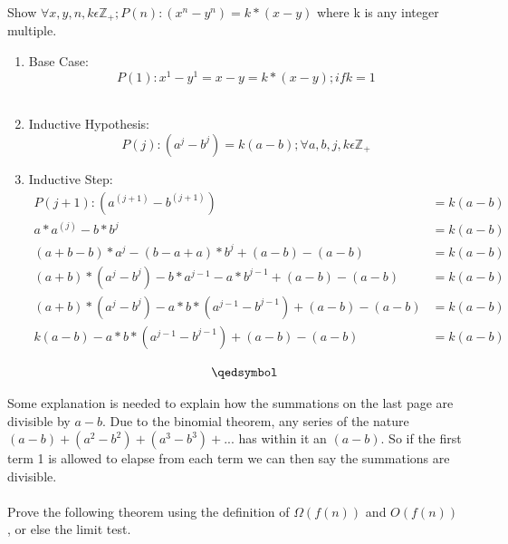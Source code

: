 \documentclass[12pt]{article}
\begin{document}
\noindent Show \begin{math}\forall x,y,n,k \epsilon \mathbb{Z}_+ ; P(n):(x^n-y^n) = k * (x-y)\end{math} where k is any integer multiple.
\begin{enumerate}
\item Base Case:\\
\[P(1): x^1 - y^1   = x - y = k * (x - y); if k = 1\]\\
\item Inductive Hypothesis:
\[P(j):(a^j - b^j) = k(a - b); \forall a,b,j,k \epsilon \mathbb{Z}_+\]
\item Inductive Step:\\
\begin{align*}
P(j+1):(a^(j+1) - b^(j+1)) &= k(a-b)\\
a*a^(j) - b*b^j &= k(a-b)\\
(a+b-b)*a^j - (b - a + a)*b^j + (a - b) - (a - b) &= k(a-b)\\
(a+b)*(a^j-b^j) - b*a^{j-1}-a*b^{j-1}+ (a - b) - (a - b) &= k(a-b)\\
(a+b)*(a^j-b^j) - a*b*(a^{j-1}-b^{j-1})+ (a - b) - (a - b) &= k(a-b)\\
k(a - b) - a*b*(a^{j-1}-b^{j-1})+ (a - b) - (a - b) &= k(a-b)\\
\end{align*}
\begin{align*}
&\hspace{0.3cm}\qedsymbol
\end{align*}
\end{enumerate}
Some explanation is needed to explain how the summations on the last page are divisible by \begin{math} a - b\end{math}. Due to the binomial theorem, any series of the nature \begin{math} (a - b) + (a^2 - b^2) + (a^3 - b^3) + ...  \end{math} has within it an \begin{math} (a - b) \end{math}. So if the first term 1 is allowed to elapse from each term we can then say the summations are divisible.\\\\
Prove the following theorem using the definition of \begin{math} \Omega (f (n))\end{math} and \begin{math}O(f (n))\end{math} , or else the limit test.\\\\
\end{document}
